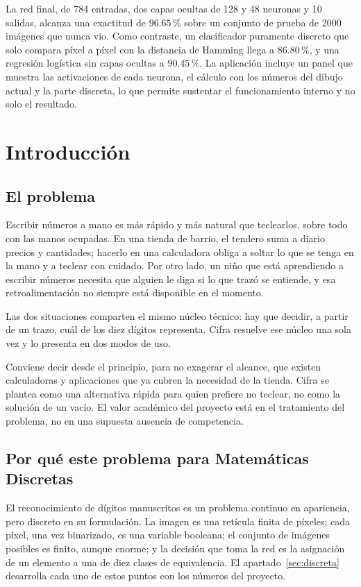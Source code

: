 \documentclass[12pt,letterpaper]{article}
\newcommand{\pc}{\,\%}
\begin{document}
La red final, de 784 entradas, dos capas ocultas de 128 y 48 neuronas y 10
salidas, alcanza una exactitud de $96.65\pc$ sobre un conjunto de prueba de 2000
imágenes que nunca vio. Como contraste, un clasificador puramente discreto que
solo compara píxel a píxel con la distancia de Hamming llega a $86.80\pc$, y una
regresión logística sin capas ocultas a $90.45\pc$. La aplicación incluye un panel
que muestra las activaciones de cada neurona, el cálculo con los números del
dibujo actual y la parte discreta, lo que permite sustentar el funcionamiento
interno y no solo el resultado.

\section{Introducción}

\subsection{El problema}

Escribir números a mano es más rápido y más natural que teclearlos, sobre todo con
las manos ocupadas. En una tienda de barrio, el tendero suma a diario precios y
cantidades; hacerlo en una calculadora obliga a soltar lo que se tenga en la mano
y a teclear con cuidado. Por otro lado, un niño que está aprendiendo a escribir
números necesita que alguien le diga si lo que trazó se entiende, y esa
retroalimentación no siempre está disponible en el momento.

Las dos situaciones comparten el mismo núcleo técnico: hay que decidir, a partir
de un trazo, cuál de los diez dígitos representa. Cifra resuelve ese núcleo una
sola vez y lo presenta en dos modos de uso.

Conviene decir desde el principio, para no exagerar el alcance, que existen
calculadoras y aplicaciones que ya cubren la necesidad de la tienda. Cifra se
plantea como una alternativa rápida para quien prefiere no teclear, no como la
solución de un vacío. El valor académico del proyecto está en el tratamiento del
problema, no en una supuesta ausencia de competencia.

\subsection{Por qué este problema para Matemáticas Discretas}

El reconocimiento de dígitos manuscritos es un problema continuo en apariencia,
pero discreto en su formulación. La imagen es una retícula finita de píxeles; cada
píxel, una vez binarizado, es una variable booleana; el conjunto de imágenes
posibles es finito, aunque enorme; y la decisión que toma la red es la asignación
de un elemento a una de diez clases de equivalencia. El apartado~\ref{sec:discreta}
desarrolla cada uno de estos puntos con los números del proyecto.
\end{document}
